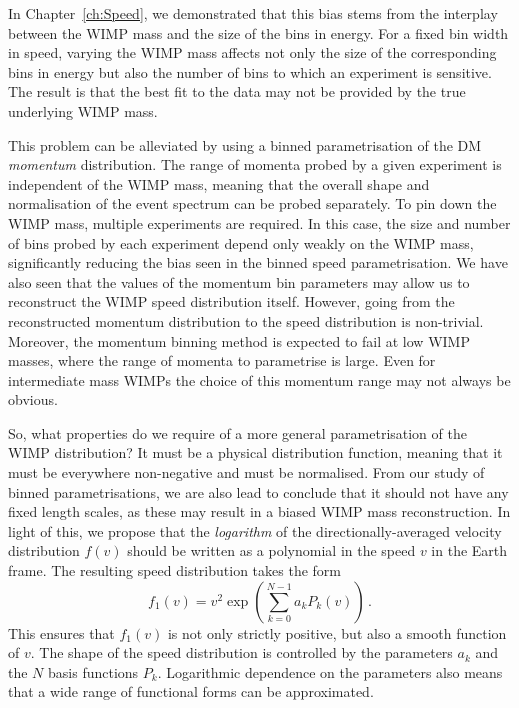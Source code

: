 In Chapter~\ref{ch:Speed}, we demonstrated that this bias stems from the interplay between the WIMP mass and the size of the bins in energy. For a fixed bin width in speed, varying the WIMP mass affects not only the size of the corresponding bins in energy but also the number of bins to which an experiment is sensitive. The result is that the best fit to the data may not be provided by the true underlying WIMP mass.

This problem can be alleviated by using a binned parametrisation of the DM \textit{momentum} distribution. The range of momenta probed by a given experiment is independent of the WIMP mass, meaning that the overall shape and normalisation of the event spectrum can be probed separately. To pin down the WIMP mass, multiple experiments are required. In this case, the size and number of bins probed by each experiment depend only weakly on the WIMP mass, significantly reducing the bias seen in the binned speed parametrisation. We have also seen that the values of the momentum bin parameters may allow us to reconstruct the WIMP speed distribution itself. However, going from the reconstructed momentum distribution to the speed distribution is non-trivial. Moreover, the momentum binning method is expected to fail at low WIMP masses, where the range of momenta to parametrise is large. Even for intermediate mass WIMPs the choice of this momentum range may not always be obvious.

So, what properties do we require of a more general parametrisation of the WIMP distribution? It must be a physical distribution function, meaning that it must be everywhere non-negative and must be normalised. From our study of binned parametrisations, we are also lead to conclude that it should not have any fixed length scales, as these may result in a biased WIMP mass reconstruction. In light of this, we propose that the \textit{logarithm} of the directionally-averaged velocity distribution $f(v)$ should be written as a polynomial in the speed $v$ in the Earth frame. The resulting speed distribution takes the form
\begin{equation}
f_1(v) = v^2 \exp \left(\sum_{k=0}^{N-1} a_k P_k(v)\right)\,.
\end{equation}
This ensures that $f_1(v)$ is not only strictly positive, but also a smooth function of $v$. The shape of the speed distribution is controlled by the parameters $a_k$ and the $N$ basis functions $P_k$. Logarithmic dependence on the parameters also means that a wide range of functional forms can be approximated.

